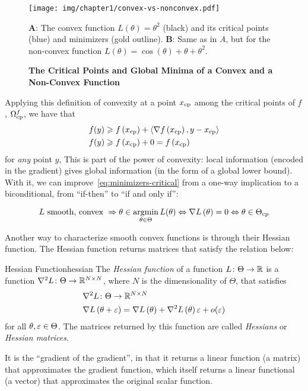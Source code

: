 \documentclass[../../thesis.tex]{subfiles}
\begin{document}
\begin{figure}[ht]
	\begin{center}
		\texttt{[image: img/chapter1/convex-vs-nonconvex.pdf]}
	\end{center}
	\caption{\textbf{The Critical Points and Global Minima
	of a Convex and a Non-Convex Function}}{\textbf{A}:
	The convex function $L(\theta) = \theta^2$ (black)
	and its critical points (blue)
	and minimizers (gold outline).
	\textbf{B}:
	Same as in \emph{A}, but for the non-convex function
	$L(\theta) = \cos(\theta) + \theta +\theta^2$.}
\end{figure}

Applying this definition of convexity at a point $x_{\mathrm{cp}}$
among the critical points of $f$, $\Omega^f_{\mathrm{cp}}$,
we have that
\begin{align}
	f(y) &\geqslant f\left(x_{\mathrm{cp}}\right) + \langle\nabla f\left(x_{\mathrm{cp}}\right), y - x_{\mathrm{cp}} \rangle\\
	f(y) &\geqslant f\left(x_{\mathrm{cp}}\right) + 0 = f\left(x_{\mathrm{cp}}\right)
\end{align}
for \emph{any} point $y$,
This is part of the power of convexity:
local information (encoded in the gradient)
gives global information (in the form of a global lower bound).
With it, we can improve~\ref{eq:minimizers-critical}
from a one-way implication to a biconditional,
from \enquote{if-then} to
\enquote{if and only if}:

\begin{equation}\equationlabel{convexity-critical}
	L \text{\ smooth, convex\ } \Rightarrow\\
	\theta \in \argmin_{\theta \in \Theta} L(\theta) \Leftrightarrow \grad{L}{\theta} = 0 \Leftrightarrow \theta \in \Theta_{\cp}
\end{equation}

Another way to characterize smooth convex functions is through their Hessian function.
The Hessian function returns matrices that satisfy the relation below:
\begin{definition}{Hessian Function}{hessian}
	The \emph{Hessian function} of a function $L \colon \Theta \to \mathbb{R}$
	is a function $\nabla^2{L} \colon \Theta \to \mathbb{R}^{N\times N}$,
	where $N$ is the dimensionality of $\Theta$,
	that satisfies
	\begin{align}
		&\nabla^2{L}\from \Theta \to \R^{N\times N}\\
		&\grad{L}{\theta + \eps} = \grad{L}{\theta} + \hess{L}{\theta}\eps + o(\eps)\equationlabel{def-hessian}
	\end{align}
	for all $\theta, \varepsilon \in \Theta$.
	The matrices returned by this function are called \emph{Hessians}
	or \emph{Hessian matrices}.
\end{definition}
It is the \enquote{gradient of the gradient},
in that it returns a linear function (a matrix)
that approximates the gradient function,
which itself returns a linear functional (a vector)
that approximates the original scalar function.
\end{document}
